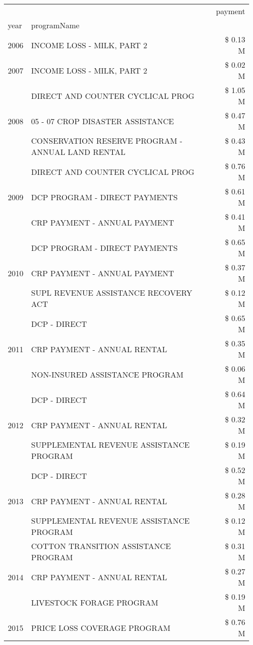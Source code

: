 \begin{tabular}{llr}
\toprule
 &  & payment \\
year & programName &  \\
\midrule
2006 & INCOME LOSS - MILK, PART 2 & \$ 0.13 M \\
\cline{1-3}
2007 & INCOME LOSS - MILK, PART 2 & \$ 0.02 M \\
\cline{1-3}
\multirow[t]{3}{*}{2008} & DIRECT AND COUNTER CYCLICAL PROG & \$ 1.05 M \\
 & 05 - 07 CROP DISASTER ASSISTANCE & \$ 0.47 M \\
 & CONSERVATION RESERVE PROGRAM - ANNUAL LAND RENTAL & \$ 0.43 M \\
\cline{1-3}
\multirow[t]{3}{*}{2009} & DIRECT AND COUNTER CYCLICAL PROG & \$ 0.76 M \\
 & DCP PROGRAM - DIRECT PAYMENTS & \$ 0.61 M \\
 & CRP PAYMENT - ANNUAL PAYMENT & \$ 0.41 M \\
\cline{1-3}
\multirow[t]{3}{*}{2010} & DCP PROGRAM - DIRECT PAYMENTS & \$ 0.65 M \\
 & CRP PAYMENT - ANNUAL PAYMENT & \$ 0.37 M \\
 & SUPL REVENUE ASSISTANCE RECOVERY ACT & \$ 0.12 M \\
\cline{1-3}
\multirow[t]{3}{*}{2011} & DCP - DIRECT & \$ 0.65 M \\
 & CRP PAYMENT - ANNUAL RENTAL & \$ 0.35 M \\
 & NON-INSURED ASSISTANCE PROGRAM & \$ 0.06 M \\
\cline{1-3}
\multirow[t]{3}{*}{2012} & DCP - DIRECT & \$ 0.64 M \\
 & CRP PAYMENT - ANNUAL RENTAL & \$ 0.32 M \\
 & SUPPLEMENTAL REVENUE ASSISTANCE PROGRAM & \$ 0.19 M \\
\cline{1-3}
\multirow[t]{3}{*}{2013} & DCP - DIRECT & \$ 0.52 M \\
 & CRP PAYMENT - ANNUAL RENTAL & \$ 0.28 M \\
 & SUPPLEMENTAL REVENUE ASSISTANCE PROGRAM & \$ 0.12 M \\
\cline{1-3}
\multirow[t]{3}{*}{2014} & COTTON TRANSITION ASSISTANCE PROGRAM & \$ 0.31 M \\
 & CRP PAYMENT - ANNUAL RENTAL & \$ 0.27 M \\
 & LIVESTOCK FORAGE PROGRAM & \$ 0.19 M \\
\cline{1-3}
\multirow[t]{3}{*}{2015} & PRICE LOSS COVERAGE PROGRAM & \$ 0.76 M \\

\end{tabular}
